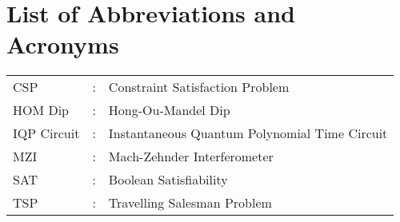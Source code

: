 \chapter*{List of Abbreviations and Acronyms}

\begin{tabular}{lcl}
CSP                 &:     & Constraint Satisfaction Problem\\
HOM Dip &: & Hong-Ou-Mandel Dip\\
IQP Circuit &: & Instantaneous Quantum Polynomial Time Circuit\\
MZI &: & Mach-Zehnder Interferometer\\
SAT                 &:     & Boolean Satisfiability\\
TSP                 &:     & Travelling Salesman Problem\\
\end{tabular}
